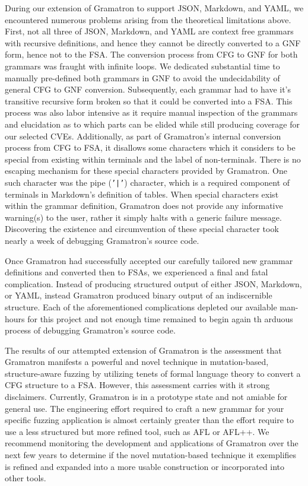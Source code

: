\documentclass[12pt]{diazessay}
\begin{document}
During our extension of Gramatron to support JSON, Markdown, and YAML, we encountered numerous problems arising from the theoretical limitations above.
First, not all three of JSON, Markdown, and YAML are context free grammars with recursive definitions, and hence they cannot be directly converted to a GNF form, hence not to the FSA.
The conversion process from CFG to GNF for both grammars was fraught with infinite loops.
We dedicated substantial time to manually pre-defined both grammars in GNF to avoid the undecidability of general CFG to GNF conversion.
Subsequently, each grammar had to have it's transitive recursive form broken so that it could be converted into a FSA.
This process was also labor intensive as it require manual inspection of the grammars and elucidation as to which parts can be elided while still producing coverage for our selected CVEs.
Additionally, as part of Gramatron's internal conversion process from CFG to FSA, it disallows some characters which it considers to be special from existing within terminals and the label of non-terminals.
There is no escaping mechanism for these special characters provided by Gramatron.
One such character was the pipe (\texttt{'|'}) character, which is a required component of terminals in Markdown's definition of tables.
When special characters exist within the grammar definition, Gramatron does not provide any informative warning(s) to the user, rather it simply halts with a generic failure message.
Discovering the existence and circumvention of these special character took nearly a week of debugging Gramatron's source code.

Once Gramatron had successfully accepted our carefully tailored new grammar definitions and converted then to FSAs, we experienced a final and fatal complication.
Instead of producing structured output of either JSON, Markdown, or YAML, instead Gramatron produced binary output of an indiscernible structure.
Each of the aforementioned complications depleted our available man-hours for this project and not enough time remained to begin again th arduous process of debugging Gramatron's source code.

The results of our attempted extension of Gramatron is the assessment that Gramatron manifests a powerful and novel technique in mutation-based, structure-aware fuzzing by utilizing tenets of formal language theory to convert a CFG structure to a FSA.
However, this assessment carries with it strong disclaimers.
Currently, Gramatron is in a prototype state and not amiable for general use. 
The engineering effort required to craft a new grammar for your specific fuzzing application is almost certainly greater than the effort require to use a less structured but more refined tool, such as AFL or AFL++.
We recommend monitoring the development and applications of Gramatron over the next few years to determine if the novel mutation-based technique it exemplifies is refined and expanded into a more usable construction or incorporated into other tools.
\end{document}

